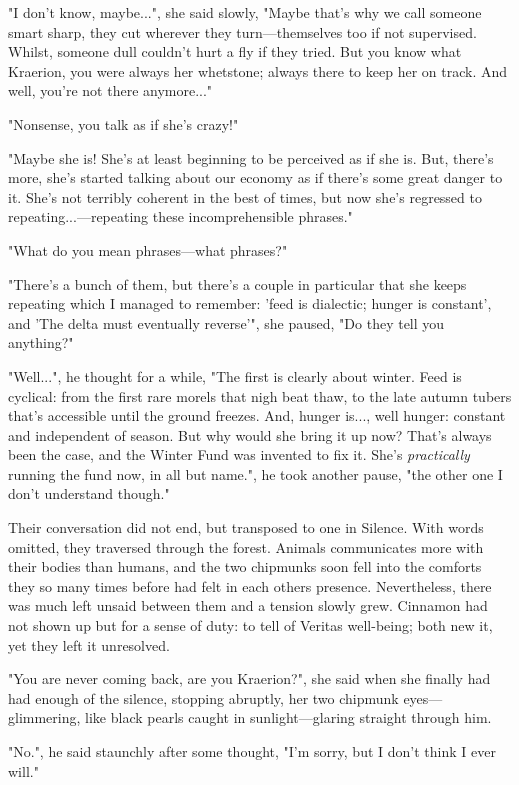 "I don't know, maybe...", she said slowly, "Maybe that's why we call someone smart sharp, they cut wherever they turn---themselves too if not supervised. Whilst, someone dull couldn't hurt a fly if they tried. But you know what Kraerion, you were always her whetstone; always there to keep her on track. And well, you're not there anymore..."

"Nonsense, you talk as if she's crazy!"

"Maybe she is! She's at least beginning to be perceived as if she is. But, there's more, she's started talking about our economy as if there's some great danger to it. She's not terribly coherent in the best of times, but now she's regressed to repeating...---repeating these incomprehensible phrases."

"What do you mean phrases---what phrases?"

"There's a bunch of them, but there's a couple in particular that she keeps repeating which I managed to remember: 'feed is dialectic; hunger is constant', and 'The delta must eventually reverse'", she paused, "Do they tell you anything?"

"Well...", he thought for a while, "The first is clearly about winter. Feed is cyclical: from the first rare morels that nigh beat thaw, to the late autumn tubers that's accessible until the ground freezes. And, hunger is..., well hunger: constant and independent of season. But why would she bring it up now? That's always been the case, and the Winter Fund was invented to fix it. She's \textit{practically} running the fund now, in all but name.", he took another pause, "the other one I don't understand though."

Their conversation did not end, but transposed to one in Silence. With words omitted, they traversed through the forest. Animals communicates more with their bodies than humans, and the two chipmunks soon fell into the comforts they so many times before had felt in each others presence. Nevertheless, there was much left unsaid between them and a tension slowly grew. Cinnamon had not shown up but for a sense of duty: to tell of Veritas well-being; both new it, yet they left it unresolved.

"You are never coming back, are you Kraerion?", she said when she finally had had enough of the silence, stopping abruptly, her two chipmunk eyes---glimmering, like black pearls caught in sunlight---glaring straight through him.

"No.", he said staunchly after some thought, "I'm sorry, but I don't think I ever will."

